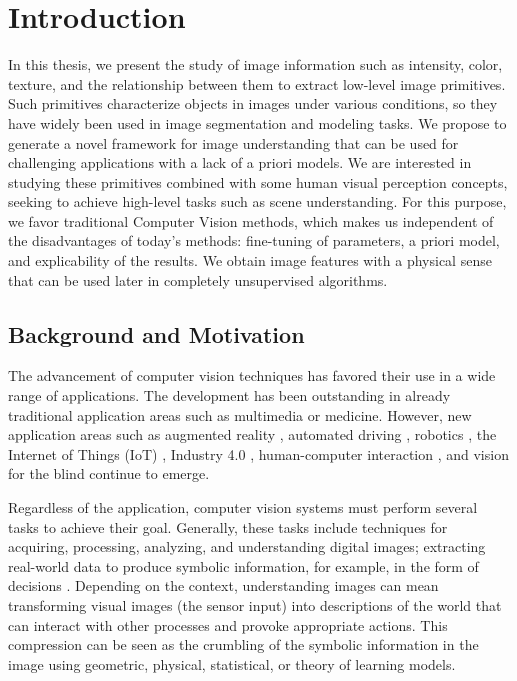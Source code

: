 \chapter*{Introduction}
In this thesis, we present the study of image information such as intensity, color, texture, and the relationship between them to extract low-level image primitives. Such primitives characterize objects in images under various conditions, so they have widely been used in image segmentation and modeling tasks. We propose to generate a novel framework for image understanding that can be used for challenging applications with a lack of a priori models. We are interested in studying these primitives combined with some human visual perception concepts, seeking to achieve high-level tasks such as scene understanding. For this purpose, we favor traditional Computer Vision methods, which makes us independent of the disadvantages of today's methods: fine-tuning of parameters, a priori model, and explicability of the results. We obtain image features with a physical sense that can be used later in completely unsupervised algorithms.

\section*{Background and Motivation}
The advancement of computer vision techniques has favored their use in a wide range of applications. The development has been outstanding in already traditional application areas such as multimedia or medicine. However, new application areas such as augmented reality \citep{AbuAlhaija.Mustikovela.ea:IJCV:2018}, automated driving \citep{Janai.Guney.ea:CGV:2020}, robotics \citep{Sankowski.Nowakowski:BOOK:2014}, the Internet of Things (IoT) \citep{Othman.Aydin:CICN:2017}, Industry 4.0 \citep{Zhong.Xu.ea:ENG:2017}, human-computer interaction \citep{Ke.Liu.ea:BOOK5:2018}, and vision for the blind \citep{Ahmed.Balasubramanian.ea:IUI:2020} continue to emerge.

Regardless of the application, computer vision systems must perform several tasks to achieve their goal. Generally, these tasks include techniques for acquiring, processing, analyzing, and understanding digital images; extracting real-world data to produce symbolic information, for example, in the form of decisions \citep{Wiley.Lucas:IJAI:2018}. Depending on the context, understanding images can mean transforming visual images (the sensor input) into descriptions of the world that can interact with other processes and provoke appropriate actions. This compression can be seen as the crumbling of the symbolic information in the image using geometric, physical, statistical, or theory of learning models.

